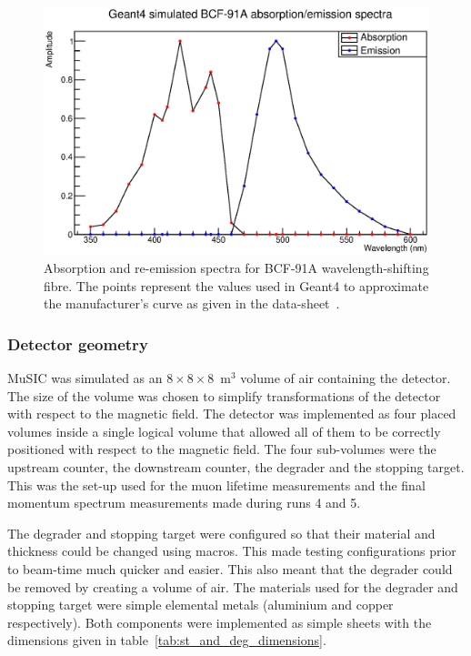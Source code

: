 \begin{figure}[hptb]
  \centering
    \includegraphics[width=.9\textwidth]{images/bcf-91a-g4.eps}
  \caption{Absorption and re-emission spectra for BCF-91A wavelength-shifting fibre. The points represent the values used in Geant4 to approximate the manufacturer's curve as given in the data-sheet~\cite{bcf_91a}.}
  \label{fig:images_bcf-91a-g4}
\end{figure}

\subsubsection{Detector geometry} %
\label{ssub:implementation_detector_geometry}

MuSIC was simulated as an \(8\times8\times8\)~m\(^3\) volume of air containing the detector. The size of the volume was chosen to simplify transformations of the detector with respect to the magnetic field. The detector was implemented as four placed volumes inside a single logical volume that allowed all of them to be correctly positioned with respect to the magnetic field. The four sub-volumes were the upstream counter, the downstream counter, the degrader and the stopping target. This was the set-up used for the muon lifetime measurements and the final momentum spectrum measurements made during runs 4 and 5.

The degrader and stopping target were configured so that their material and thickness could be changed using macros. This made testing configurations prior to beam-time much quicker and easier. This also meant that the degrader could be removed by creating a volume of air. The materials used for the degrader and stopping target were simple elemental metals (aluminium and copper respectively). Both components were implemented as simple sheets with the dimensions given in table~\ref{tab:st_and_deg_dimensions}.

